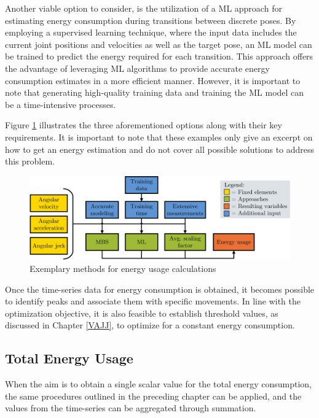 Another viable option to consider, is the utilization of a \acrshort{ML} approach for estimating energy consumption during transitions between discrete poses. By employing a supervised learning technique, where the input data includes the current joint positions and velocities as well as the target pose, an \acrshort{ML} model can be trained to predict the energy required for each transition. This approach offers the advantage of leveraging \acrshort{ML} algorithms to provide accurate energy consumption estimates in a more efficient manner. However, it is important to note that generating high-quality training data and training the \acrshort{ML} model can be a time-intensive processes.

Figure \ref{ENERGYOPTIONS} illustrates the three aforementioned options along with their key requirements. It is important to note that these examples only give an excerpt on how to get an energy estimation and do not cover all possible solutions to address this problem. 

\begin{figure}[H]
	\centerline{\includegraphics[width=1\textwidth]{figures/ENERGYOPTIONS.png}}
	\caption{Exemplary methods for energy usage calculations}
	\label{ENERGYOPTIONS}
\end{figure}

Once the time-series data for energy consumption is obtained, it becomes possible to identify peaks and associate them with specific movements. In line with the optimization objective, it is also feasible to establish threshold values, as discussed in Chapter \ref{VAJJ}, to optimize for a constant energy consumption.

\newpage
\subsection{Total Energy Usage}
When the aim is to obtain a single scalar value for the total energy consumption, the same procedures outlined in the preceding chapter can be applied, and the values from the time-series can be aggregated through summation.

